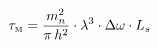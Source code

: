 \documentclass{article}
\begin{document}
\[ \tau_{\text{\tiny M}} = \frac{m_n^2}{\pi\,h^2} \cdot \lambda^3 \cdot \Delta\omega \cdot L_s \]
\end{document}
